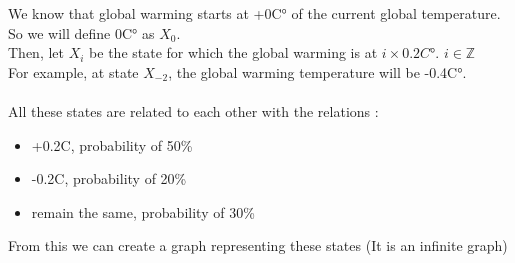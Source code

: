\documentclass{article}
\begin{document}

    We know that global warming starts at +0C° of the current global temperature.\\
    So we will define 0C° as $X_0$.\\
    Then, let $X_i$ be the state for which the global warming is at $i\times0.2C°$. $i\in \mathbb{Z}$\\
    For example, at state $X_{-2}$, the global warming temperature will be -0.4C°.\\
    \\
    All these states are related to each other with the relations :
    \begin{itemize}
        \item +0.2C, probability of 50\%
        \item -0.2C, probability of 20\%
        \item remain the same, probability of 30\%
    \end{itemize}
    From this we can create a graph representing these states (It is an infinite graph)
\end{document}
